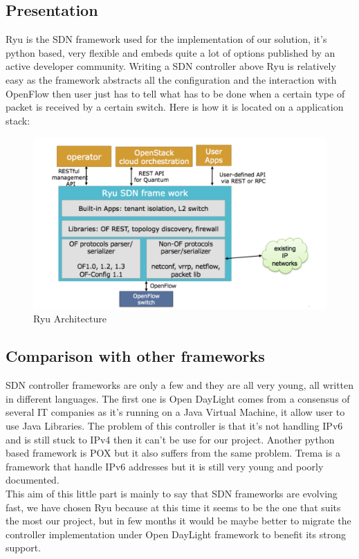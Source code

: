 \documentclass{article}
\begin{document}
\subsection{Presentation}
Ryu is the SDN framework used for the implementation of our solution,
it's python based, very flexible and embeds quite a lot of options
published by an active developer community. Writing a SDN controller
above Ryu is relatively easy as the framework abstracts all the
configuration and the interaction with OpenFlow then user just has to
tell what has to be done when a certain type of packet is received by
a certain switch.  Here is how it is located on a application stack:

\begin{figure}[h!]
  \centering
    \includegraphics[scale=0.3]{reportPictures/ryu_layers.png}
  \caption{Ryu Architecture}
\end{figure}

\newpage 

\subsection{Comparison with other frameworks}
SDN controller frameworks are only a few and they are all very young,
all written in different languages. The first one is Open DayLight
comes from a consensus of several IT companies as it's running on a
Java Virtual Machine, it allow user to use Java Libraries. The problem
of this controller is that it's not handling IPv6 and is still stuck
to IPv4 then it can't be use for our project. Another python based
framework is POX but it also suffers from the same problem. Trema is a
framework that handle IPv6 addresses but it is still very young and
poorly documented.\\
\newline
This aim of this little part is mainly to say that SDN frameworks are
evolving fast, we have chosen Ryu because at this time it seems to be
the one that suits the most our project, but in few months it would be
maybe better to migrate the controller implementation under Open
DayLight framework to benefit its strong support.
\end{document}
